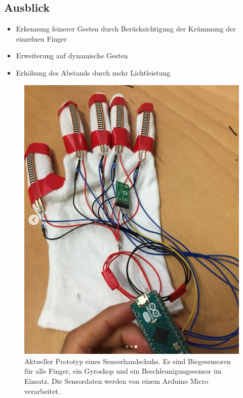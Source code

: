 \documentclass{sciposter}
\begin{document}
\begin{multicols}{3}


\section{Ausblick}
\noindent

\begin{itemize}
	\item Erkennung feinerer Gesten durch Berücksichtigung der Krümmung der einzelnen Finger
	\item Erweiterung auf dynamische Gesten
	\item Erhöhung des Abstands durch mehr Lichtleistung
\end{itemize}

\begin{figure}[h]
	\centering
	\includegraphics[scale=1.4]{../figures/Sensorhandschuh}
	\caption{Aktueller Prototyp eines Sensorhandschuhs. Es sind Biegesensoren für alle Finger, ein Gyroskop und ein Beschleunigungssensor im Einsatz. Die Sensordaten werden von einem Arduino Micro verarbeitet.}
	\label{fig:Sensorhandschuh}
\end{figure}


\end{multicols}
\end{document}
